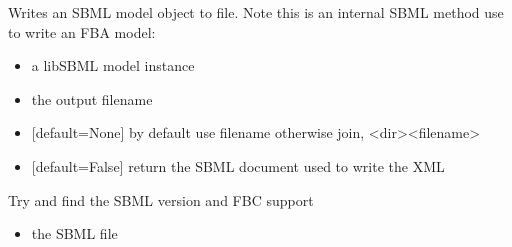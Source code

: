 \documentclass[letterpaper,10pt,english]{sphinxmanual}
\begin{document}

\begin{fulllineitems}
\label{\detokenize{modules_doc:cbmpy.CBXML.sbml_exportSBML2FBAModel}}
\pysigstartsignatures
{}
\pysigstopsignatures
\sphinxAtStartPar
Writes an SBML model object to file. Note this is an internal SBML method use  to write an FBA model:
\begin{itemize}
\item {} 
\sphinxAtStartPar
{} a libSBML model instance

\item {} 
\sphinxAtStartPar
{} the output filename

\item {} 
\sphinxAtStartPar
{} {[}default=None{]} by default use filename otherwise join, \textless{}dir\textgreater{}\textless{}filename\textgreater{}

\item {} 
\sphinxAtStartPar
{} {[}default=False{]} return the SBML document used to write the XML

\end{itemize}

\end{fulllineitems}


\begin{fulllineitems}
\label{\detokenize{modules_doc:cbmpy.CBXML.sbml_fileFindVersion}}
\pysigstartsignatures
{}
\pysigstopsignatures
\sphinxAtStartPar
Try and find the SBML version and FBC support
\begin{itemize}
\item {} 
\sphinxAtStartPar
{} the SBML file

\end{itemize}

\end{fulllineitems}
\end{document}
